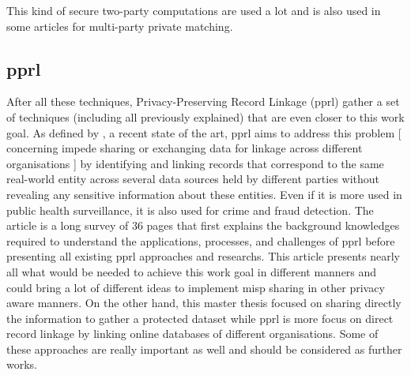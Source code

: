 \documentclass{eplmastersthesis}
\begin{document}
This kind of secure two-party computations are used a lot and is also used in some articles for multi-party private matching. \\

\subsection{\gls{pprl}}
After all these techniques, Privacy-Preserving Record Linkage (\gls{pprl}) gather a set of techniques (including all previously explained) that are even closer to this work goal. As defined by \cite{vatsalanprivacy}, a recent state of the art, \gls{pprl} aims to address this problem [ concerning impede sharing or exchanging data for linkage across different organisations ] by identifying and linking records that correspond to the same real-world entity across several data sources held by different parties without revealing any sensitive information about these entities.
Even if it is more used in public health surveillance, it is also used for crime and fraud detection.
The article is a long survey of 36 pages that first explains the background knowledges required to understand the applications, processes, and challenges of \gls{pprl} before presenting all existing \gls{pprl} approaches and researchs.
This article presents nearly all what would be needed to achieve this work goal in different manners and could bring a lot of different ideas to implement \gls{misp} sharing in other privacy aware manners.
On the other hand, this master thesis focused on sharing directly the information to gather a protected dataset while \gls{pprl} is more focus on direct record linkage by linking online databases of different organisations. Some of these approaches are really important as well and should be considered as further works.
\end{document}
